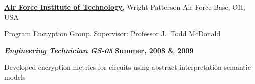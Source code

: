 \href{http://www.ll.mit.edu/}{\textbf{Air Force Institute of Technology}},
Wright-Patterson Air Force Base, OH, USA

Program Encryption Group.
Supervisor: 
\href{http://www.soc.southalabama.edu/~mcdonald/}
{Professor J.~Todd McDonald}
\vspace{-0.5em}
\begin{outerlist}

\vspace{-0.25em}

\item[] \textbf{\textit{Engineering Technician GS-05}}%
\hfill \textbf{Summer, 2008 \& 2009}

\vspace{-0.5em}

Developed encryption metrics for circuits using abstract interpretation semantic models

\end{outerlist}
